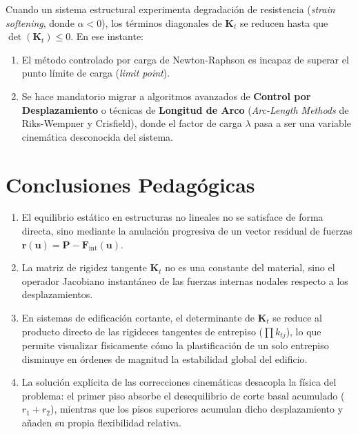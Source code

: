 \documentclass[11pt,letterpaper]{article}
\begin{document}
Cuando un sistema estructural experimenta degradación de resistencia (\textit{strain softening}, donde $\alpha < 0$), los términos diagonales de $\mathbf{K}_t$ se reducen hasta que $\det(\mathbf{K}_t) \le 0$. En ese instante:
\begin{enumerate}
    \item El método controlado por carga de Newton-Raphson es incapaz de superar el punto límite de carga (\textit{limit point}).
    \item Se hace mandatorio migrar a algoritmos avanzados de \textbf{Control por Desplazamiento} o técnicas de \textbf{Longitud de Arco} (\textit{Arc-Length Methods} de Riks-Wempner y Crisfield), donde el factor de carga $\lambda$ pasa a ser una variable cinemática desconocida del sistema.
\end{enumerate}

\section{Conclusiones Pedagógicas}

\begin{enumerate}
    \item El equilibrio estático en estructuras no lineales no se satisface de forma directa, sino mediante la anulación progresiva de un vector residual de fuerzas $\mathbf{r}(\mathbf{u}) = \mathbf{P} - \mathbf{F}_{\text{int}}(\mathbf{u})$.
    \item La matriz de rigidez tangente $\mathbf{K}_t$ no es una constante del material, sino el operador Jacobiano instantáneo de las fuerzas internas nodales respecto a los desplazamientos.
    \item En sistemas de edificación cortante, el determinante de $\mathbf{K}_t$ se reduce al producto directo de las rigideces tangentes de entrepiso ($\prod k_{tj}$), lo que permite visualizar físicamente cómo la plastificación de un solo entrepiso disminuye en órdenes de magnitud la estabilidad global del edificio.
    \item La solución explícita de las correcciones cinemáticas desacopla la física del problema: el primer piso absorbe el desequilibrio de corte basal acumulado ($r_1 + r_2$), mientras que los pisos superiores acumulan dicho desplazamiento y añaden su propia flexibilidad relativa.
\end{enumerate}
\end{document}
